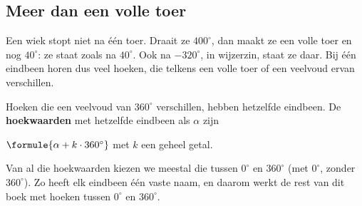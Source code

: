 \begin{oefeningen}
\end{oefeningen}

\subsection{Meer dan een volle toer}

Een wiek stopt niet na één toer. Draait ze $400^\circ$, dan maakt ze een volle toer en nog $40^\circ$: ze staat zoals na $40^\circ$. Ook na $-320^\circ$, in wijzerzin, staat ze daar. Bij één eindbeen horen dus veel hoeken, die telkens een volle toer of een veelvoud ervan verschillen.

\begin{theorie}
Hoeken die een veelvoud van $360^\circ$ verschillen, hebben hetzelfde eindbeen. De \textbf{\textcolor{accent}{hoekwaarden}} met hetzelfde eindbeen als $\alpha$ zijn

\vspace{1mm}
\qquad $\formule{\alpha + k \cdot 360^\circ}$ \quad met $k$ een geheel getal.
\end{theorie}

Van al die hoekwaarden kiezen we meestal die tussen $0^\circ$ en $360^\circ$ (met $0^\circ$, zonder $360^\circ$). Zo heeft elk eindbeen één vaste naam, en daarom werkt de rest van dit boek met hoeken tussen $0^\circ$ en $360^\circ$.


